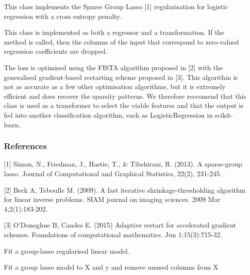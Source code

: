 \documentclass[letterpaper,10pt,english]{sphinxmanual}
\begin{document}
{\begin{fulllineitems}
This class implements the Sparse Group Lasso {[}1{]} regularisation for
logistic regression with a cross entropy penalty.

This class is implemented as both a regressor and a transformation.
If the  method is called, then the columns of the input
that correspond to zero-valued regression coefficients are dropped.

The loss is optimised using the FISTA algorithm proposed in {[}2{]} with the
generalised gradient-based restarting scheme proposed in {[}3{]}. This
algorithm is not as accurate as a few other optimisation algorithms,
but it is extremely efficient and does recover the sparsity patterns.
We therefore reccomend that this class is used as a transformer to select
the viable features and that the output is fed into another classification
algorithm, such as LogisticRegression in scikit-learn.
\subsubsection*{References}

{[}1{]} Simon, N., Friedman, J., Hastie, T., \& Tibshirani, R. (2013).
A sparse-group lasso. Journal of Computational and Graphical
Statistics, 22(2), 231-245.

{[}2{]} Beck A, Teboulle M. (2009). A fast iterative shrinkage-thresholding
algorithm for linear inverse problems. SIAM journal on imaging
sciences. 2009 Mar 4;2(1):183-202.

{[}3{]} O’Donoghue B, Candes E. (2015) Adaptive restart for accelerated
gradient schemes. Foundations of computational mathematics.
Jun 1;15(3):715-32.

\begin{fulllineitems}
\label{\detokenize{api_reference:group_lasso.LogisticGroupLasso.fit}}
Fit a group-lasso regularised linear model.

\end{fulllineitems}


\begin{fulllineitems}
\label{\detokenize{api_reference:group_lasso.LogisticGroupLasso.fit_transform}}
Fit a group lasso model to X and y and remove unused columns from X


\end{fulllineitems}
\end{fulllineitems}}
\end{document}
